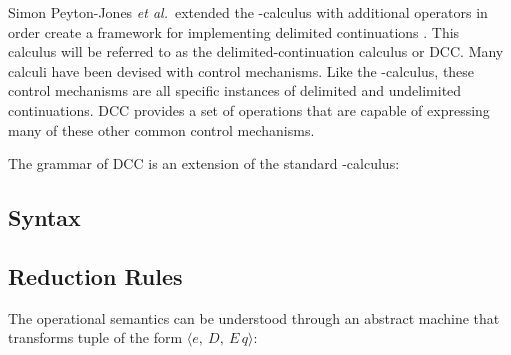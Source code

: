   Simon Peyton-Jones \textit{et al.}\ extended the \lam-calculus with additional operators in order create a framework for implementing delimited continuations \cite{JonesDS07}. This calculus will be referred to as the delimited-continuation calculus or DCC. Many calculi have been devised with control mechanisms. Like the \lmu-calculus, these control mechanisms are all specific instances of delimited and undelimited continuations. DCC provides a set of operations that are capable of expressing many of these other common control mechanisms.

  The grammar of DCC is an extension of the standard \lam-calculus:

  \subsection{Syntax}
  \begin{figure}[!h]
  \end{figure}

  \subsection{Reduction Rules}
  The operational semantics can be understood through an abstract machine that transforms tuple of the form $\langle e,\ D,\ E\, q \rangle$:

